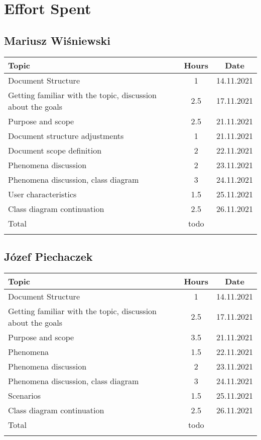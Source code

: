 \chapter{Effort Spent}

\section*{Mariusz Wiśniewski}
\begin{table}[H]
    \centering
    \begin{tabular}{lcc} \Xhline{1.5pt}
        Topic & Hours & Date\\ \hline
        Document Structure & 1 & 14.11.2021\\ 
        Getting familiar with the topic, discussion about the goals & 2.5 & 17.11.2021\\ 
        Purpose and scope & 2.5 & 21.11.2021\\ 
        Document structure adjustments & 1 & 21.11.2021\\
        Document scope definition & 2 & 22.11.2021\\
        Phenomena discussion & 2 & 23.11.2021\\
        Phenomena discussion, class diagram & 3 & 24.11.2021\\ 
        User characteristics & 1.5 & 25.11.2021\\ 
        Class diagram continuation & 2.5 & 26.11.2021 \\ \hline
        Total & todo &\\ \Xhline{1.5pt}
    \end{tabular}
\end{table}

\section*{Józef Piechaczek}
\begin{table}[H]
    \centering
    \begin{tabular}{lcc} \Xhline{1.5pt}
        Topic &  Hours & Date \\ \hline
        Document Structure & 1 & 14.11.2021 \\ 
        Getting familiar with the topic, discussion about the goals & 2.5 & 17.11.2021 \\ 
        Purpose and scope & 3.5 & 21.11.2021 \\ 
        Phenomena & 1.5 & 22.11.2021 \\ 
        Phenomena discussion & 2 & 23.11.2021 \\
        Phenomena discussion, class diagram & 3 & 24.11.2021 \\ 
        Scenarios & 1.5 & 25.11.2021 \\
        Class diagram continuation & 2.5 & 26.11.2021 \\ \hline
        Total &  todo & \\ \Xhline{1.5pt}
    \end{tabular}
\end{table}

